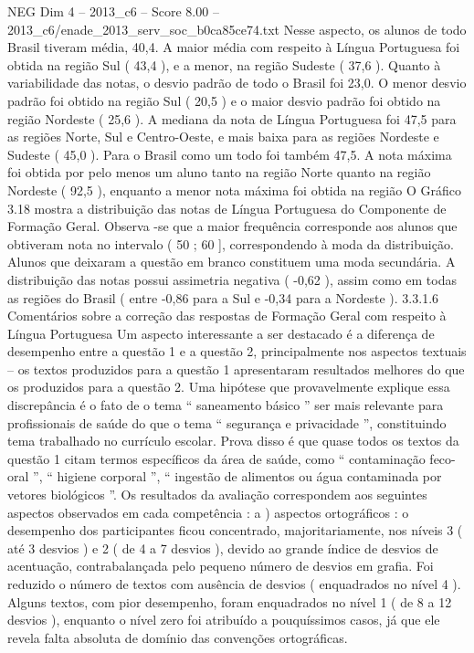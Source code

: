 \begin{textsample}{NEG Dim 4 – 2013\_c6 – Score 8.00 – 2013\_c6/enade\_2013\_serv\_soc\_b0ca85ce74.txt}
Nesse aspecto, os alunos de todo Brasil tiveram média, 40,4.
A maior média com respeito à Língua Portuguesa foi obtida na região Sul ( 43,4 ), e a menor, na região Sudeste ( 37,6 ).
Quanto à variabilidade das notas, o desvio padrão de todo o Brasil foi 23,0.
O menor desvio padrão foi obtido na região Sul ( 20,5 ) e o maior desvio padrão foi obtido na região Nordeste ( 25,6 ).
A mediana da nota de Língua Portuguesa foi 47,5 para as regiões Norte, Sul e Centro-Oeste, e mais baixa para as regiões Nordeste e Sudeste ( 45,0 ).
Para o Brasil como um todo foi também 47,5.
A nota máxima foi obtida por pelo menos um aluno tanto na região Norte quanto na região Nordeste ( 92,5 ), enquanto a menor nota máxima foi obtida na região O Gráfico 3.18 mostra a distribuição das notas de Língua Portuguesa do Componente de Formação Geral.
Observa -se que a maior frequência corresponde aos alunos que obtiveram nota no intervalo ( 50 ; 60 ], correspondendo à moda da distribuição.
Alunos que deixaram a questão em branco constituem uma moda secundária.
A distribuição das notas possui assimetria negativa ( -0,62 ), assim como em todas as regiões do Brasil ( entre -0,86 para a Sul e -0,34 para a Nordeste ). 3.3.1.6 Comentários sobre a correção das respostas de Formação Geral com respeito à Língua Portuguesa Um aspecto interessante a ser destacado é a diferença de desempenho entre a questão 1 e a questão 2, principalmente nos aspectos textuais – os textos produzidos para a questão 1 apresentaram resultados melhores do que os produzidos para a questão 2.
Uma hipótese que provavelmente explique essa discrepância é o fato de o tema “ saneamento básico ” ser mais relevante para profissionais de saúde do que o tema “ segurança e privacidade ”, constituindo tema trabalhado no currículo escolar.
Prova disso é que quase todos os textos da questão 1 citam termos específicos da área de saúde, como “ contaminação feco-oral ”, “ higiene corporal ”, “ ingestão de alimentos ou água contaminada por vetores biológicos ”.
Os resultados da avaliação correspondem aos seguintes aspectos observados em cada competência : a ) aspectos ortográficos : o desempenho dos participantes ficou concentrado, majoritariamente, nos níveis 3 ( até 3 desvios ) e 2 ( de 4 a 7 desvios ), devido ao grande índice de desvios de acentuação, contrabalançada pelo pequeno número de desvios em grafia.
Foi reduzido o número de textos com ausência de desvios ( enquadrados no nível 4 ).
Alguns textos, com pior desempenho, foram enquadrados no nível 1 ( de 8 a 12 desvios ), enquanto o nível zero foi atribuído a pouquíssimos casos, já que ele revela falta absoluta de domínio das convenções ortográficas.

\end{textsample}
